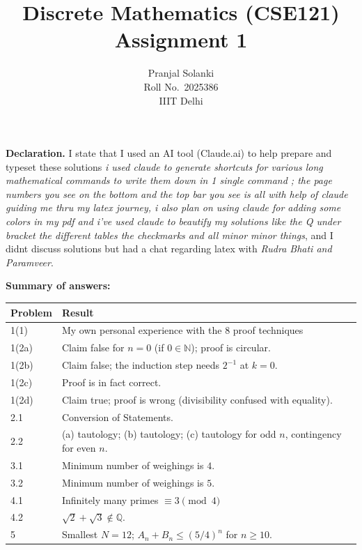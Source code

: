 \documentclass[11pt,a4paper]{article}
\newcommand{\studentname}{Pranjal Solanki}
\newcommand{\rollno}{2025386}
\newcommand{\N}{\mathbb{N}}
\newcommand{\Q}{\mathbb{Q}}
\theoremstyle{definition}
\begin{document}
\title{\textbf{Discrete Mathematics (CSE121)}\\[2pt] Assignment 1}
\author{\studentname \\ Roll No.\ \rollno \\ IIIT Delhi}
\date{}
\maketitle
\thispagestyle{fancy}

\noindent\textbf{Declaration.} 
I state that I used an AI tool (Claude.ai) 
to help prepare and typeset these solutions \textit{i used claude to generate shortcuts for various long 
mathematical commands to write them down in 1 single command ; the page numbers you see on the bottom and the top bar you see is all with help of claude guiding me thru my latex journey, i also plan on using claude for adding some colors in my pdf and i've used claude to beautify my solutions like the Q under bracket the different tables the checkmarks and all minor minor things}, 
and I didnt discuss solutions but had a chat regarding latex with \textit{Rudra Bhati and Paramveer}.

\medskip
\noindent\textbf{Summary of answers:}
\begin{center}
\begin{tabular}{@{ }ll@{ }}
\toprule
Problem & Result\\
\midrule
1(1) & My own personal experience with the 8 proof techniques\\
1(2a) & Claim false for $n=0$ (if $0\in\N$); proof is circular.\\
1(2b) & Claim false; the induction step needs $2^{-1}$ at $k=0$.\\
1(2c) & Proof is in fact correct.\\
1(2d) & Claim true; proof is wrong (divisibility confused with equality).\\
2.1 & Conversion of Statements.\\
2.2 & (a) tautology; (b) tautology; (c) tautology for odd $n$, contingency for even $n$.\\
3.1 & Minimum number of weighings is $4$.\\
3.2 & Minimum number of weighings is $5$.\\
4.1 & Infinitely many primes $\equiv3\pmod4$\\
4.2 & $\sqrt2+\sqrt3\notin\Q$.\\
5 & Smallest $N=12$; $A_n+B_n\le(5/4)^n$ for $n\ge10$.\\
\bottomrule
\end{tabular}
\end{center}
\end{document}
